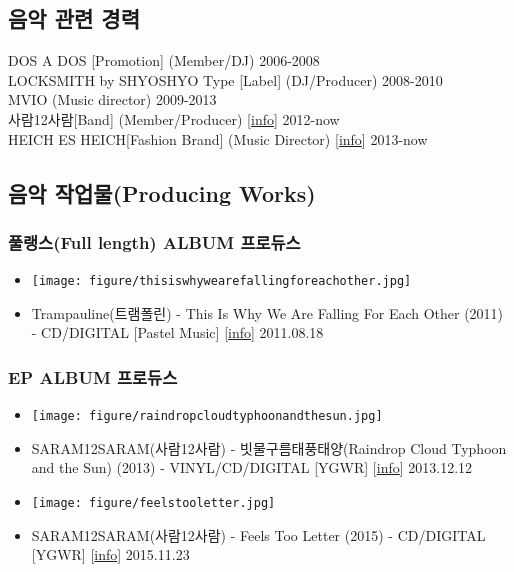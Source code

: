 \subsection{음악 관련 경력} DOS A DOS [Promotion] (Member/DJ) \hfill 2006-2008\\
LOCKSMITH by SHYOSHYO Type [Label] (DJ/Producer) \hfill 2008-2010\\
MVIO (Music director) \hfill 2009-2013\\
사람12사람[Band] (Member/Producer) [\href{http://saram12saram.tumblr.com/}{\footnotesize{info}}] \hfill 2012-now\\
HEICH ES HEICH[Fashion Brand] (Music Director) [\href{http://www.heich.kr/}{\footnotesize{info}}] \hfill 2013-now\\

\subsection{음악 작업물(Producing Works)} 
\subsubsection{풀랭스(Full length) ALBUM 프로듀스}
\begin{itemize}
\item \texttt{[image: figure/thisiswhywearefallingforeachother.jpg]}
\item Trampauline(트램폴린) - This Is Why We Are Falling For Each Other (2011) - CD/DIGITAL [Pastel Music] [\href{http://www.pastelmusic.com/pastelmusic_scrap.html?musicIdx=323}{\footnotesize{info}}] \hfill 2011.08.18
\end{itemize}
\subsubsection{EP ALBUM 프로듀스}
\begin{itemize}
\item \texttt{[image: figure/raindropcloudtyphoonandthesun.jpg]}
\item SARAM12SARAM(사람12사람) - 빗물구름태풍태양(Raindrop Cloud Typhoon and the Sun) (2013) - VINYL/CD/DIGITAL [YGWR] [\href{http://younggiftedwack.com/archives/6303}{\footnotesize{info}}] \hfill 2013.12.12
\end{itemize}
\begin{itemize}
\item \texttt{[image: figure/feelstooletter.jpg]}
\item SARAM12SARAM(사람12사람) - Feels Too Letter (2015) - CD/DIGITAL [YGWR] [\href{https://younggiftedwack.bandcamp.com/album/feels-too-letter}{\footnotesize{info}}] \hfill 2015.11.23
\end{itemize}

